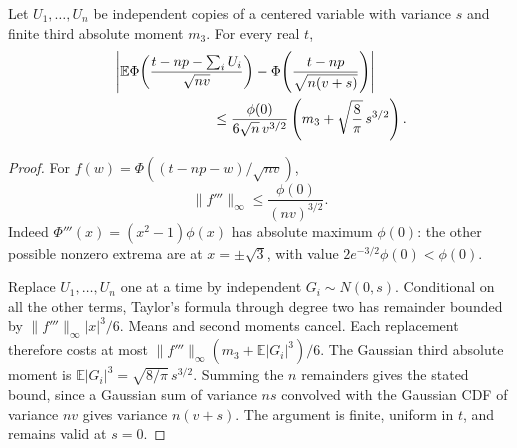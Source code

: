 \documentclass[11pt,a4paper]{article}
\newcommand{\E}{\mathbb E}\newcommand{\Pp}{\mathbb P}
\begin{document}
\begin{lemma}
\label{lem:smooth}
Let $U_1,\ldots,U_n$ be independent copies of a centered variable with
variance $s$ and finite third absolute moment $m_3$.
For every real $t$,
\begin{align}\label{eq:smooth}
 &\left|\E\Phi\!\left(\frac{t-np-\sum_iU_i}{\sqrt{nv}}\right)
       -\Phi\!\left(\frac{t-np}{\sqrt{n(v+s)}}\right)\right|\\
 &\hspace{25mm}\le
 \frac{\phi(0)}{6\sqrt n\,v^{3/2}}
                  \left(m_3+\sqrt{\frac8\pi}\,s^{3/2}\right).\notag
\end{align}
\end{lemma}
\begin{proof}
For $f(w)=\Phi((t-np-w)/\sqrt{nv})$,
\[
       \|f'''\|_\infty\le\frac{\phi(0)}{(nv)^{3/2}}.
\]
Indeed $\Phi'''(x)=(x^2-1)\phi(x)$ has absolute maximum $\phi(0)$:
the other possible nonzero extrema are at $x=\pm\sqrt3$, with value
$2e^{-3/2}\phi(0)<\phi(0)$.

Replace $U_1,\ldots,U_n$ one at a time by independent
$G_i\sim N(0,s)$. Conditional on all the other terms, Taylor's formula
through degree two has remainder bounded by
$\|f'''\|_\infty|x|^3/6$. Means and second moments cancel.
Each replacement therefore costs at most
$\|f'''\|_\infty(m_3+\E|G_i|^3)/6$.
The Gaussian third absolute moment is
$\E|G_i|^3=\sqrt{8/\pi}\,s^{3/2}$. Summing the $n$ remainders gives
the stated bound, since a Gaussian sum of variance $ns$ convolved
with the Gaussian CDF of variance $nv$ gives variance $n(v+s)$.
The argument is finite, uniform in $t$, and remains valid at $s=0$.
\end{proof}
\end{document}
